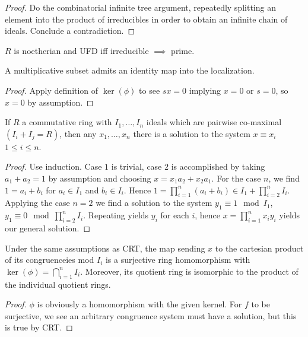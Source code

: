 \begin{proof}
	Do the combinatorial infinite tree argument, repeatedly splitting an element into the product of irreducibles in order to obtain an infinite chain of ideals. Conclude a contradiction.
\end{proof}
\begin{proposition}
	\(R\) is noetherian and UFD iff irreducible \(\implies\) prime.
\end{proposition}
\begin{theorem}
	A multiplicative subset admits an identity map into the localization.
\end{theorem}
\begin{proof}
	Apply definition of \(\ker \left(  \phi\right) \) to see \(sx = 0\) implying \(x = 0\) or \(s = 0\), so \(x = 0\) by assumption.
\end{proof}
\begin{theorem}[CRT]
	If \(R\) a commutative ring with \(I_1, \ldots, I_{n}\) ideals which are pairwise co-maximal \(\left( I_{i} + I_{j} = R\right) \), then any \(x_1, \ldots, x_{n}\) there is a solution to the system \(x \equiv x_{i}\) \(1 \le i \le n\).
\end{theorem}
\begin{proof}
Use induction. Case \(1\) is trivial, case \(2\) is accomplished by taking \(a_1 + a_2 = 1\) 	by assumption and choosing \(x = x_1 a_2 + x_2 a_1\). For the case \(n\), we find \(1 = a_{i} + b_{i}\) for \(a_{i} \in I_1\) and \(b_{i} \in I_{i}\). Hence \(1 = \prod_{i= 1}^{n} \left( a_{i} + b_{i} \right) \in I_1 + \prod_{i=2}^{n} I_{i}   \).\\
Applying the case \(n = 2\) we find a solution to the system \(y_1 \equiv 1 \mod I_1\), \(y_1 \equiv 0 \mod \prod_{i=2}^{n} I_{i} \). Repeating yields \(y_{i}\) for each \(i\), hence \(x = \prod_{i= 1}^{n} x_{i} y_{i} \) yields our general solution.
\end{proof}
\begin{theorem}
	Under the same assumptions as CRT, the map sending \(x\) to the cartesian product of its congruenceies mod \(I_{i}\) is a surjective ring homomorphism with \(\ker \left( \phi \right)  = \bigcap_{i=1} ^{n} I_{i}\). Moreover, its quotient ring is isomorphic to the product of the individual quotient rings.
\end{theorem}
\begin{proof}
	\(\phi\) is obviously a homomorphism with the given kernel. For \(f\) to be surjective, we see an arbitrary congruence system must have a solution, but this is true by CRT.
\end{proof}

